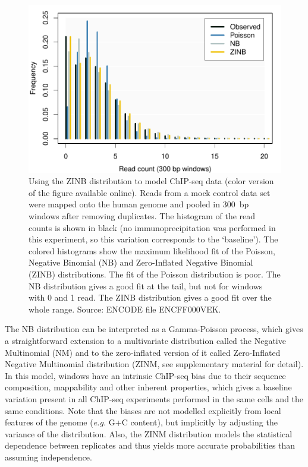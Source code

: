 \documentclass{bioinfo}
\begin{document}
\begin{methods}
\begin{figure}[!tpb]
\centerline{\includegraphics[scale=0.55]{ZINB_fit.pdf}}
\caption{
  Using the ZINB distribution to model ChIP-seq data (color
  version of the figure available online). Reads from
  a mock control data set were mapped onto the human genome and
  pooled in 300~bp windows after removing duplicates. The histogram of
  the read counts is shown in black (no immunoprecipitation was
  performed in this experiment, so this variation corresponds to the
  `baseline'). The colored histograms show the maximum
  likelihood fit of the Poisson, Negative Binomial (NB) and
  Zero-Inflated Negative Binomial (ZINB) distributions. The fit of
  the Poisson distribution is poor. The NB distribution
  gives a good fit at the tail, but not for windows with
  0 and 1 read. The ZINB distribution gives a good fit
  over the whole range. Source: ENCODE file ENCFF000VEK.
}\label{fig:ZINB_fit}
\end{figure}

The NB distribution can be interpreted as a Gamma-Poisson process,
which gives a straightforward extension to a multivariate
distribution called the Negative Multinomial (NM) and to the
zero-inflated version of it called Zero-Inflated Negative Multinomial
distribution (ZINM, see supplementary material for detail). In this
model, windows have an intrinsic ChIP-seq bias due to their sequence
composition, mappability and other inherent properties, which gives
a baseline variation present in all ChIP-seq experiments performed
in the same cells and the same conditions. Note that the biases are
not modelled explicitly from local features of the genome (\textit{e.g.}
G+C content), but implicitly by adjusting the variance of the
distribution. Also, the ZINM distribution models the statistical
dependence between replicates and thus yields more accurate
probabilities than assuming independence.


\end{methods}
\end{document}
